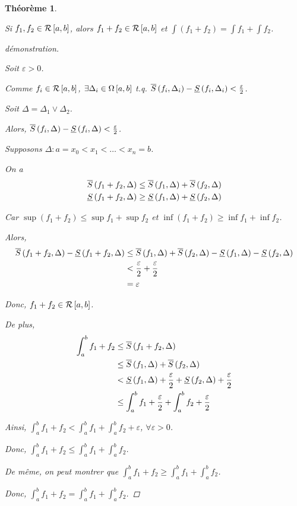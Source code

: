 \documentclass{report}
\newcommand*{\raffinement}[2]{#1 \vee #2}
\newcommand*{\eps}{\varepsilon}
\newtheorem*{thm}{Th\'eor\`eme}
\theoremstyle{definition}
\theoremstyle{remark}
\begin{document}
	\begin{thm}
		~

		Si $f_1,f_2 \in \riemann$, alors $f_1+f_2 \in \riemann$ et $\int \left( f_1+f_2 \right) =\int f_1 + \int f_2$.
		\begin{proof}[d\'emonstration]~

			Soit $\eps>0$.

			Comme $f_i \in \riemann$, $\exists\Delta_i \in \partitions$ t.q. $\ssup{f_i}[\Delta_i]-\sinf{f_i}[\Delta_i]<\frac{\eps}{2}$.

			Soit $\Delta = \raffinement{\Delta_1}{\Delta_2}$.

			Alors, $\ssup{f_i}-\sinf{f_i}<\frac{\eps}{2}$.

			Supposons $\Delta:a=x_0<x_1<\dotsc<x_n=b$.

			On a
			\begin{align*}
				\ssup{f_1+f_2}&\leq \ssup{f_1} + \ssup{f_2}\\
				\sinf{f_1+f_2}&\geq \sinf{f_1} + \sinf{f_2}
			\end{align*}

			Car $\sup(f_1+f_2) \leq \sup f_1 + \sup f_2$ et $\inf(f_1+f_2) \geq \inf f_1 + \inf f_2$.

			Alors,
			\begin{align*}
				\ssup{f_1+f_2}-\sinf{f_1+f_2}&\leq \ssup{f_1} + \ssup{f_2} - \sinf{f_1} - \sinf{f_2}\\
				&< \frac{\eps}{2} + \frac{\eps}{2}\\
				&= \eps
			\end{align*}

			Donc, $f_1+f_2 \in \riemann$.

			De plus,
			\begin{align*}
				\int_{a}^{b}f_1+f_2&\leq \ssup{f_1+f_2}\\
				&\leq \ssup{f_1} + \ssup{f_2}\\
				&< \sinf{f_1}+\frac{\eps}{2} + \sinf{f_2}+\frac{\eps}{2}\\
				&\leq \int_{a}^{b}f_1+\frac{\eps}{2} + \int_{a}^{b}f_2+\frac{\eps}{2}
			\end{align*}

			Ainsi, $\int_{a}^{b}f_1+f_2 < \int_{a}^{b}f_1 + \int_{a}^{b}f_2 + \eps$, $\forall\eps>0$.

			Donc, $\int_{a}^{b}f_1+f_2 \leq \int_{a}^{b}f_1 + \int_{a}^{b}f_2$.

			De m\^eme, on peut montrer que $\int_{a}^{b}f_1+f_2 \geq \int_{a}^{b}f_1 + \int_{a}^{b}f_2$.

			Donc, $\int_{a}^{b}f_1+f_2 = \int_{a}^{b}f_1 + \int_{a}^{b}f_2$.
		\end{proof}
	\end{thm}
\end{document}
